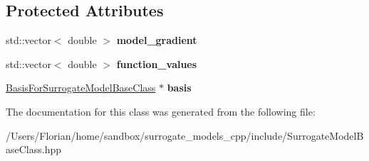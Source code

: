 \subsection*{Protected Attributes}
\begin{DoxyCompactItemize}
\item 
std\+::vector$<$ double $>$ {\bfseries model\+\_\+gradient}\hypertarget{class_surrogate_model_base_class_a1fb21745db10b96a6368fcb5be0816ba}{}\label{class_surrogate_model_base_class_a1fb21745db10b96a6368fcb5be0816ba}

\item 
std\+::vector$<$ double $>$ {\bfseries function\+\_\+values}\hypertarget{class_surrogate_model_base_class_a3ff38e153c774c29d2be43b961939f27}{}\label{class_surrogate_model_base_class_a3ff38e153c774c29d2be43b961939f27}

\item 
\hyperlink{class_basis_for_surrogate_model_base_class}{Basis\+For\+Surrogate\+Model\+Base\+Class} $\ast$ {\bfseries basis}\hypertarget{class_surrogate_model_base_class_a4f6cee722bbed149272c669df6bc945c}{}\label{class_surrogate_model_base_class_a4f6cee722bbed149272c669df6bc945c}

\end{DoxyCompactItemize}


The documentation for this class was generated from the following file\+:\begin{DoxyCompactItemize}
\item 
/\+Users/\+Florian/home/sandbox/surrogate\+\_\+models\+\_\+cpp/include/Surrogate\+Model\+Base\+Class.\+hpp\end{DoxyCompactItemize}
